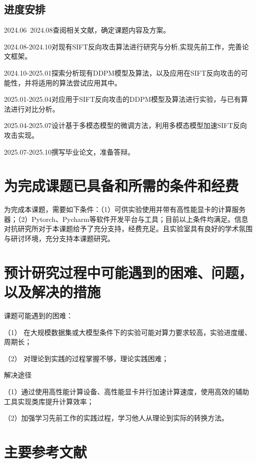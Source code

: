\subsection{进度安排}
      2024.06~2024.08\quad 查阅相关文献，确定课题内容及方案。
\par  2024.08-2024.10\quad 对现有SIFT反向攻击算法进行研究与分析,实现先前工作，完善论文框架。
\par  2024.10-2025.01\quad 探索分析现有DDPM模型及算法，以及应用在SIFT反向攻击的可能性，并将适用的算法尝试应用其中。
\par  2025.01-2025.04\quad 对应用于SIFT反向攻击的DDPM模型及算法进行实验，与已有算法进行对比分析。
\par  2025.04-2025.07\quad 设计基于多模态模型的微调方法，利用多模态模型加速SIFT反向攻击实现。
\par  2025.07-2025.10\quad 撰写毕业论文，准备答辩。
\section{为完成课题已具备和所需的条件和经费}
为完成本课题，需要如下条件：（1）可供实验使用并带有高性能显卡的计算服务器；（2）Pytorch、Pycharm等软件开发平台与工具；目前以上条件均满足。信息对抗研究所对于本课题给予了充分支持，经费充足。且实验室具有良好的学术氛围与研讨环境，充分支持本课题研究。
\section{预计研究过程中可能遇到的困难、问题，以及解决的措施}
课题可能遇到的困难：
\par （1） 在大规模数据集或大模型条件下的实验可能对算力要求较高，实验进度缓、周期长；
\par （2） 对理论到实践的过程掌握不够，理论实践困难；
\par 解决途径
\par （1）通过使用高性能计算设备、高性能显卡并行加速计算速度，使用高效的辅助工具实现类库提升计算效率；
\par （2）加强学习先前工作的实践过程，学习他人从理论到实际的转换方法。
\section{主要参考文献}



